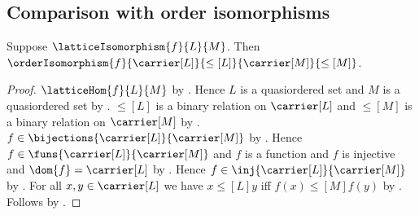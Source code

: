 \subsection{Comparison with order isomorphisms}

\begin{theorem}\label{lattice_isomorphism_implies_order_isomorphism}
    Suppose $\latticeIsomorphism{f}{L}{M}$.
    Then
        $\orderIsomorphism
            {f}{\carrier[L]}{\leq[L]}{\carrier[M]}{\leq[M]}$.
\end{theorem}
\begin{proof}
    $\latticeHom{f}{L}{M}$ by
        .
    Hence $L$ is a quasiordered set and $M$ is a quasiordered set by
        .
    $\leq[L]$ is a binary relation on $\carrier[L]$ and
        $\leq[M]$ is a binary relation on $\carrier[M]$ by
        .
    $f\in\bijections{\carrier[L]}{\carrier[M]}$ by
        .
    Hence $f\in\funs{\carrier[L]}{\carrier[M]}$ and
        $f$ is a function and $f$ is injective and
        $\dom{f}=\carrier[L]$ by
        .
    Hence $f\in\inj{\carrier[L]}{\carrier[M]}$ by
        .
    For all $x,y\in\carrier[L]$ we have
        $x\mathrel{\leq[L]}y$ iff
            $f(x)\mathrel{\leq[M]}f(y)$ by
        .
    Follows by .
\end{proof}

